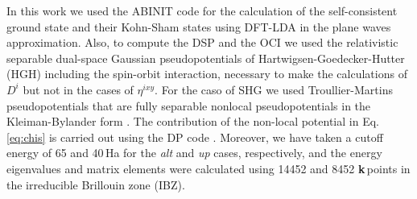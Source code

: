 \documentclass[pss]{wiley2sp} %
\begin{document}
In this work we used the ABINIT code \cite{torrent2008implementation} for the
calculation of the self-consistent ground state and their Kohn-Sham states
using DFT-LDA in the plane waves approximation. Also, to compute the DSP
and the OCI we used the relativistic separable dual-space Gaussian
pseudopotentials of Hartwigsen-Goedecker-Hutter (HGH)
\cite{hartwigsen1998relativistic} including the spin-orbit interaction,
necessary to make the calculations of $D^{i} $ but not in the cases of {$\eta^{ixy}$}.
For the caso of SHG we used Troullier-Martins pseudopotentials
\cite{troullier1991efficient} that are fully separable nonlocal
pseudopotentials in the Kleiman-Bylander form \cite{kleinman1982efficacious}.
The contribution of the non-local potential in Eq. \ref{eq:chis} is carried out
using the DP code \cite{olevanoDP}. Moreover, we have taken a cutoff energy of
65 and 40\,Ha for the \emph{alt} and \emph{up} cases, respectively, and
the energy eigenvalues and matrix elements were calculated using 14452 and 8452
\textbf{k}\,points in the irreducible Brillouin zone (IBZ).
\end{document}

